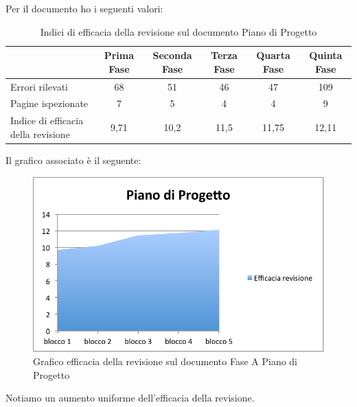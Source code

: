						Per il documento  ho i seguenti valori:
						\begin{table}[H]\centering
							\begin{tabu}{| l | c | c | c | c | c |}
								\hline
												&Prima Fase 	& Seconda Fase	& Terza Fase	& Quarta Fase 	& Quinta Fase  \\ \hline
												
								Errori rilevati				& 68		& 51 		& 46			& 47 		& 109 	 \\ \hline
								Pagine ispezionate			& 7			& 5 			& 4				& 4	 		& 9	 	  \\ \hline\hline
							
								Indice di efficacia della revisione 	 & 9,71		& 10,2 		& 11,5			& 11,75 		& 12,11 	  \\ \hline
							\end{tabu}
							\caption{Indici di efficacia della revisione sul documento Piano di Progetto}
						\end{table}
						Il grafico associato è il seguente:
						\begin{figure}[H]\centering
							\includegraphics[width=12cm]{PianoDiQualifica/Pics/EfficaciaPdPFaseA.pdf}
							\caption{Grafico efficacia della revisione sul documento Fase A Piano di Progetto}
						\end{figure}
						Notiamo un aumento uniforme dell'efficacia della revisione.
					
